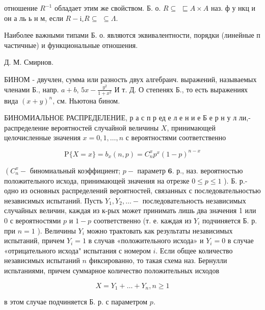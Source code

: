 \documentclass[10pt]{article}
\begin{document}
отношение $R^{-1}$ обладает этим же свойством. Б. о. $R \subseteq$ $\sqsubseteq A \times A$ наз. ф у нкц и он а ль ь н м, если $R-\mathrm{i}_{\circ} R \subseteq$ $\subseteq \Lambda$.



Наиболее важными типами Б. о. являются эквивалентности, порядки (линейные п частичные) и функциональные отношения.



Д. М. Смирнов.



БИНОМ - двучлен, сумма или разность двух алгебраич. выражений, называемых членами Б., напр. $a+b$, $5 x-\frac{y^{2}}{1+x^{2}}$ И т. Д. О степенях Б., то есть выражениях вида $(x+y)^{n}$, см. Ньютона бином.



БИНОМИАЛЬНОЕ РАСПРЕДЕЛЕНИЕ, р а с п р ед е л е н и е Б е р н у л ли,- распределение вероятностей случайной величины $X$, принимающей целочисленные значения $x=0,1, \ldots, n$ с вероятностями соответственно



\[

\mathrm{P}\{X=x\}=b_{x}(n, p)=C_{n}^{x} p^{x}(1-p)^{n-x}

\]



$\left(C_{n}^{x}-\right.$ биномиальный коэффициент; $p-$ параметр $\mathbf{6}$. р., наз. вероятностью положительного исхода, принимающей значения на отрезке $0 \leqslant p \leqslant 1$ ). Б. р.- одно из основных распределений вероятностей, связанных с последовательностью независимых испытаний. Пусть $Y_{1}, Y_{2}, \ldots-$ последовательность независимых случайных величин, каждая из к-рых может принимать лишь два значения 1 или 0 с вероятностями $p$ и $1-p$ соответственно (т. е. каждая из $Y_{i}$ подчиняется Б. р. при $n=1$ ). Величины $Y_{i}$ можно трактовать как результаты независимых испытаний, причем $Y_{i}=1$ в случав «положительного исхода» и $Y_{i}=0$ в случае «отрицательного исхода" испытания с номером $i$. Если общее количество независимых испытаний $n$ фиксированно, то такая схема наз. Бернулли испьтаниями, причем суммарное количество положительных исходов



\[

X=Y_{1}+\ldots+Y_{n}, n \geqslant 1

\]



в этом случае подчиняется Б. р. с параметром $p$.
\end{document}
